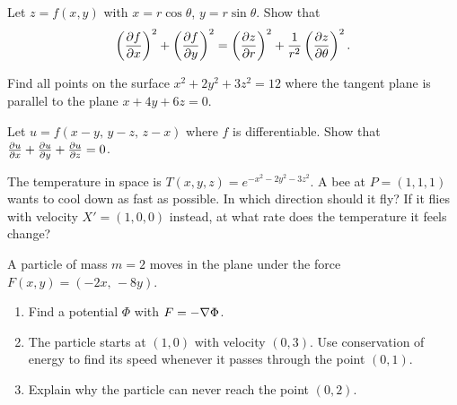 \begin{exercise}[2]
Let $z=f(x,y)$ with $x=r\cos\theta$, $y=r\sin\theta$. Show that
\[
\left(\frac{\partial f}{\partial x}\right)^2+\left(\frac{\partial f}{\partial y}\right)^2=\left(\frac{\partial z}{\partial r}\right)^2+\frac{1}{r^2}\left(\frac{\partial z}{\partial \theta}\right)^2 .
\]
\end{exercise}

\begin{exercise}[2]
Find all points on the surface $x^2+2y^2+3z^2=12$ where the tangent plane is parallel to
the plane $x+4y+6z=0$.
\end{exercise}

\begin{exercise}[2]
Let $u=f(x-y,\,y-z,\,z-x)$ where $f$ is differentiable. Show that
$\frac{\partial u}{\partial x}+\frac{\partial u}{\partial y}+\frac{\partial u}{\partial z}=0$.
\end{exercise}

\begin{exercise}[3]
The temperature in space is $T(x,y,z)=e^{-x^2-2y^2-3z^2}$. A bee at $P=(1,1,1)$ wants to
cool down as fast as possible. In which direction should it fly? If it flies with velocity
$X'=(1,0,0)$ instead, at what rate does the temperature it feels change?
\end{exercise}

\begin{exercise}[3]
A particle of mass $m=2$ moves in the plane under the force $F(x,y)=(-2x,\,-8y)$.
\begin{enumerate}[label=(\alph*)]
  \item Find a potential $\Phi$ with $F=-\nabla\Phi$.
  \item The particle starts at $(1,0)$ with velocity $(0,3)$. Use conservation of energy
  to find its speed whenever it passes through the point $(0,1)$.
  \item Explain why the particle can never reach the point $(0,2)$.
\end{enumerate}
\end{exercise}
